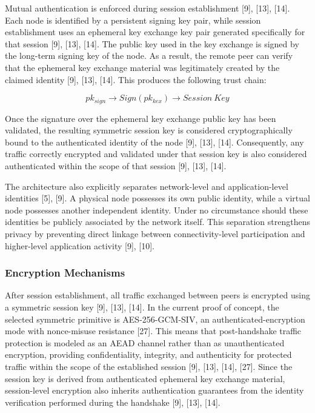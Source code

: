 \documentclass[12pt,a4paper]{article}
\begin{document}
Mutual authentication is enforced during session establishment [9], [13], [14]. Each node is identified by a persistent signing key pair, while session establishment uses an ephemeral key exchange key pair generated specifically for that session [9], [13], [14]. The public key used in the key exchange is signed by the long-term signing key of the node. As a result, the remote peer can verify that the ephemeral key exchange material was legitimately created by the claimed identity [9], [13], [14]. This produces the following trust chain:

\[
pk_{sign} \rightarrow Sign(pk_{kex}) \rightarrow Session\ Key
\]

Once the signature over the ephemeral key exchange public key has been validated, the resulting symmetric session key is considered cryptographically bound to the authenticated identity of the node [9], [13], [14]. Consequently, any traffic correctly encrypted and validated under that session key is also considered authenticated within the scope of that session [9], [13], [14].

The architecture also explicitly separates network-level and application-level identities [5], [9]. A physical node possesses its own public identity, while a virtual node possesses another independent identity. Under no circumstance should these identities be publicly associated by the network itself. This separation strengthens privacy by preventing direct linkage between connectivity-level participation and higher-level application activity [9], [10].

\subsubsection{Encryption Mechanisms}

After session establishment, all traffic exchanged between peers is encrypted using a symmetric session key [9], [13], [14]. In the current proof of concept, the selected symmetric primitive is AES-256-GCM-SIV, an authenticated-encryption mode with nonce-misuse resistance [27]. This means that post-handshake traffic protection is modeled as an AEAD channel rather than as unauthenticated encryption, providing confidentiality, integrity, and authenticity for protected traffic within the scope of the established session [9], [13], [14], [27]. Since the session key is derived from authenticated ephemeral key exchange material, session-level encryption also inherits authentication guarantees from the identity verification performed during the handshake [9], [13], [14].
\end{document}
